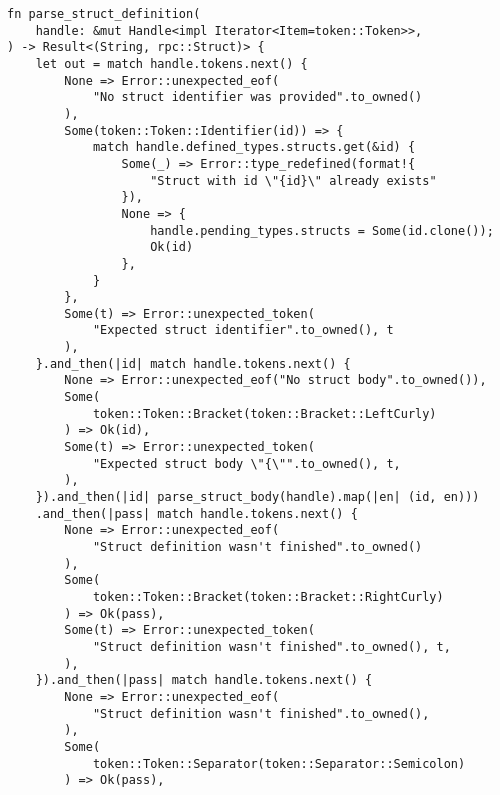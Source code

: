 \begin{lstlisting}[caption={Разбор структуры (часть 1)}, label={lst:rust_parser_struct1}]
fn parse_struct_definition(
    handle: &mut Handle<impl Iterator<Item=token::Token>>,
) -> Result<(String, rpc::Struct)> {
    let out = match handle.tokens.next() {
        None => Error::unexpected_eof(
            "No struct identifier was provided".to_owned()
        ),
        Some(token::Token::Identifier(id)) => {
            match handle.defined_types.structs.get(&id) {
                Some(_) => Error::type_redefined(format!{
                    "Struct with id \"{id}\" already exists"
                }),
                None => {
                    handle.pending_types.structs = Some(id.clone());
                    Ok(id)
                },
            }
        },
        Some(t) => Error::unexpected_token(
            "Expected struct identifier".to_owned(), t
        ),
    }.and_then(|id| match handle.tokens.next() {
        None => Error::unexpected_eof("No struct body".to_owned()),
        Some(
            token::Token::Bracket(token::Bracket::LeftCurly)
        ) => Ok(id),
        Some(t) => Error::unexpected_token(
            "Expected struct body \"{\"".to_owned(), t,
        ),
    }).and_then(|id| parse_struct_body(handle).map(|en| (id, en)))
    .and_then(|pass| match handle.tokens.next() {
        None => Error::unexpected_eof(
            "Struct definition wasn't finished".to_owned()
        ),
        Some(
            token::Token::Bracket(token::Bracket::RightCurly)
        ) => Ok(pass),
        Some(t) => Error::unexpected_token(
            "Struct definition wasn't finished".to_owned(), t,
        ),
    }).and_then(|pass| match handle.tokens.next() {
        None => Error::unexpected_eof(
            "Struct definition wasn't finished".to_owned(),
        ),
        Some(
            token::Token::Separator(token::Separator::Semicolon)
        ) => Ok(pass),
\end{lstlisting}
\clearpage
